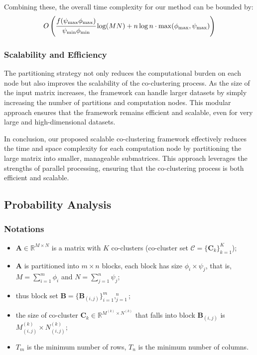 \documentclass[journal]{IEEEtran}
\begin{document}
Combining these, the overall time complexity for our method can be bounded by:
\begin{equation}
  \begin{split}
    O\left( \cfrac{f(\psi_{\text{max}} \phi_{\text{max}})}{\psi_{\text{min}} \phi_{\text{min}}} \log(MN) + n \log n \cdot \max(\phi_{\text{max}}, \psi_{\text{max}}) \right)
    \label{eq:time_complexity}
  \end{split}
\end{equation}

\subsubsection{Scalability and Efficiency}
\label{subsubsec:scalability_efficiency}
The partitioning strategy not only reduces the computational burden on each node but also improves the scalability of the co-clustering process. As the size of the input matrix increases, the framework can handle larger datasets by simply increasing the number of partitions and computation nodes. This modular approach ensures that the framework remains efficient and scalable, even for very large and high-dimensional datasets.

In conclusion, our proposed scalable co-clustering framework effectively reduces the time and space complexity for each computation node by partitioning the large matrix into smaller, manageable submatrices. This approach leverages the strengths of parallel processing, ensuring that the co-clustering process is both efficient and scalable.

\subsection{Probability Analysis}

\subsubsection{Notations}
\label{subsec:probability}
\begin{itemize}
  \item $\mathbf{A} \in \mathbb{R}^{M \times N}$ is a matrix with $K$ co-clusters (co-cluster set $\mathcal{C} = \{\mathbf{C}_k\}_{k=1}^K$);
  \item $\mathbf{A}$ is partitioned into $m \times n$ blocks, each block has size $\phi_i \times \psi_j$, that is, $M=\sum_{i=1}^m \phi_i$ and $N=\sum_{j=1}^n \psi_j$;
  \item thus block set $\mathbf{B} = \{\mathbf{B}_{(i,j)}\}_{i=1}^m,_{j=1}^n$;
  \item the size of co-cluster $\mathbf{C}_k \in \mathbb{R}^{M^{(k)} \times N^{(k)}}$ that falls into block $\mathbf{B}_{(i,j)}$ is $M_{(i,j)}^{(k)} \times N_{(i,j)}^{(k)}$;
  \item $T_m$ is the minimum number of rows, $T_n$ is the minimum number of columns.
\end{itemize}
\end{document}
